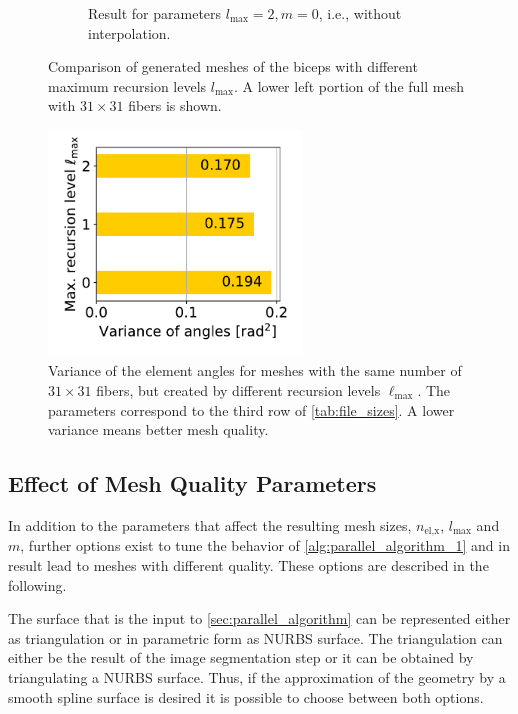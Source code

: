 \begin{figure}
\begin{subfigure}[t]{0.45\textwidth}
    \caption{Result for parameters $l_\text{max}=2, m=0$, i.e., without interpolation.}%
    \label{fig:31x31_l2_center}%
  \end{subfigure}   
   
  \caption{Comparison of generated meshes of the biceps with different maximum recursion levels $l_\text{max}$. A lower left portion of the full mesh with $31 \times 31$ fibers is shown.}%
  \label{fig:different_recursion_levels}%
\end{figure}%

\begin{figure}%
  \centering%
  \includegraphics[height=6cm]{images/parallel_fiber_estimation/mesh_quality_recursion_level.pdf}%
  \caption{Variance of the element angles for meshes with the same number of $31 \times 31$ fibers, but created by different recursion levels $\ell_\text{max}$. The parameters correspond to the third row of \cref{tab:file_sizes}. A lower variance means better mesh quality.}%
  \label{fig:2mesh_quality}%
\end{figure}%

\subsection{Effect of Mesh Quality Parameters}\label{sec:mesh_generation_mesh_quality_parameters}

In addition to the parameters that affect the resulting mesh sizes, $n_\text{el,x}$, $l_\text{max}$ and $m$, further options exist to tune the behavior of \cref{alg:parallel_algorithm_1} and in result lead to meshes with different quality. These options are described in the following.

The surface that is the input to \cref{sec:parallel_algorithm} can be represented either as triangulation or in parametric form as NURBS surface. The triangulation can either be the result of the image segmentation step or it can be obtained by triangulating a NURBS surface. Thus, if the approximation of the geometry by a smooth spline surface is desired 
it is possible to choose between both options. 

